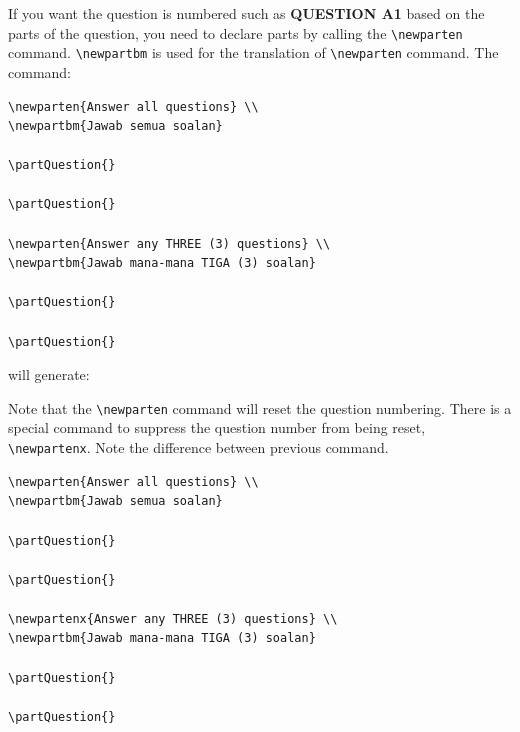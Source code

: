 \documentclass[12pt]{article}
\begin{document}
If you want the question is numbered such as \textbf{QUESTION A1} based on the parts of the question, you need to declare parts by calling the \verb|\newparten| command. \verb|\newpartbm| is used for the translation of \verb|\newparten| command. The command: \clearpage 

\begin{lstlisting}[basicstyle=\footnotesize, frame=single]
\newparten{Answer all questions} \\
\newpartbm{Jawab semua soalan}

\partQuestion{}

\partQuestion{}

\newparten{Answer any THREE (3) questions} \\
\newpartbm{Jawab mana-mana TIGA (3) soalan}

\partQuestion{}

\partQuestion{}

\end{lstlisting}

will generate: 

\begin{framed}
	
	\medskip
	
	\partQuestion{}
	
	\partQuestion{}
	
	
	\medskip
	
	\partQuestion{}
	
	\partQuestion{}
\end{framed}

Note that the \verb|\newparten| command will reset the question numbering. There is a special command to suppress the question number from being reset, \verb|\newpartenx|. Note the difference between previous command. \medskip 

\begin{lstlisting}[basicstyle=\footnotesize, frame=single]
\newparten{Answer all questions} \\
\newpartbm{Jawab semua soalan}

\partQuestion{}

\partQuestion{}

\newpartenx{Answer any THREE (3) questions} \\
\newpartbm{Jawab mana-mana TIGA (3) soalan}

\partQuestion{}

\partQuestion{}
\end{lstlisting}
\end{document}
